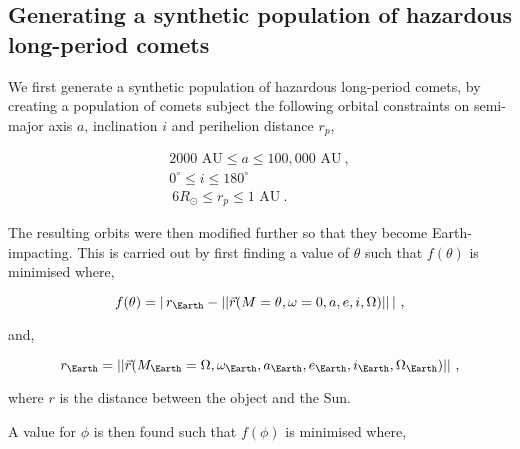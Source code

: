 \iffalse
\section{Simulating Earth observations of an impending comet impact}

\begin{equation}
    m = H + 5\log(r_{hel}r_{geo}) - 2.5\log(\phi(\theta))~.
\end{equation}
\fi



\iffalse

\subsection{Generating a synthetic population of hazardous long-period comets}

We first generate a synthetic population of hazardous long-period comets, by creating a population of comets subject the following orbital constraints on semi-major axis $a$, inclination $i$ and perihelion distance $r_p$,

\begin{equation}
    \begin{gathered}
        2000 \text{ AU} \leq a \leq 100,000 \text{ AU}~,\\
        0^{\circ} \leq i \leq 180^{\circ}~\\\
        6 R_\odot \leq r_p \leq 1 \text{ AU}~.
    \end{gathered}
\end{equation}

The resulting orbits were then modified further so that they become Earth-impacting. This is carried out by first finding a value of $\theta$ such that $f(\theta)$ is minimised where,

\begin{equation}
    f(\theta) = | \, r_{\Earth} - ||\vec{r}(M = \theta, \omega = 0, a, e, i, \Omega)|| \, | ~,
\end{equation}

and,

\begin{equation}
   r_{\Earth} = ||\vec{r}(M_{\Earth}=\Omega, \omega_{\Earth}, a_{\Earth}, e_{\Earth}, i_{\Earth}, \Omega_{\Earth})||~,
\end{equation}

where $r$ is the distance between the object and the Sun.

A value for $\phi$ is then found such that $f(\phi)$ is minimised where,

